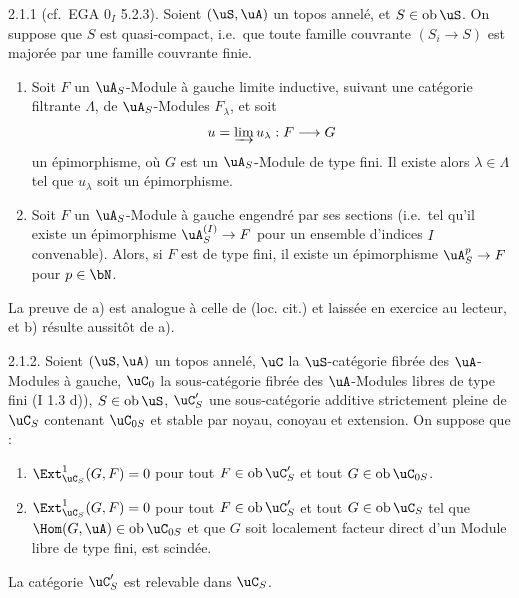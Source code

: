 \begin{lemme} 2.1.1 (cf.~EGA $0_I$ 5.2.3).
Soient $(\uS,\uA)$ un topos annel\'{e}, et $S \in \operatorname{ob} \uS$. On suppose que $S$ est quasi-compact, i.e.~que toute famille couvrante $(S_i \rightarrow S)$ est major\'{e}e par une famille couvrante finie.
\begin{enumerate}
\item[a)] Soit $F$ un $\uA_S$-Module \`{a} gauche limite inductive, suivant une cat\'{e}gorie filtrante $\Lambda$, de $\uA_S$-Modules $F_\lambda$, et soit
\[
u = \varinjlim u_\lambda : F \longrightarrow G
\]
un \'{e}pimorphisme, o\`{u} $G$ est un $\uA_S$-Module de type fini. Il existe alors $\lambda \in \Lambda$ tel que $u_\lambda$ soit un \'{e}pimorphisme.
\item[b)] Soit $F$ un $\uA_S$-Module \`{a} gauche engendr\'{e} par ses sections (i.e.~tel qu'il existe un \'{e}pimorphisme $\uA_S^{(I)} \rightarrow F$ pour un ensemble d'indices $I$ convenable). Alors, si $F$ est de type fini, il existe un \'{e}pimorphisme $\uA_S^p \rightarrow F$ pour $p \in \bN$.
\end{enumerate}
\end{lemme}

La preuve de a) est analogue \`{a} celle de (loc. cit.) et laiss\'{e}e en exercice au lecteur, et b) r\'{e}sulte aussit\^{o}t de a).

\begin{lemme} 2.1.2.
Soient $(\uS,\uA)$ un topos annel\'{e}, $\uC$ la $\uS$-cat\'{e}gorie fibr\'{e}e des $\uA$-Modules \`{a} gauche, $\uC_0$ la sous-cat\'{e}gorie fibr\'{e}e des $\uA$-Modules libres de type fini (I 1.3 d)), $S \in \operatorname{ob} \uS$, $\uC'_S$ une sous-cat\'{e}gorie additive strictement pleine de $\uC_S$ contenant $\uC_{0S}$ et stable par noyau, conoyau et extension. On suppose que :
\begin{enumerate}
\item[(i)] $\Ext_{\uC_S}^1(G,F) = 0$ pour tout $F \in \operatorname{ob} \uC'_S$ et tout $G \in \operatorname{ob} \uC_{0S}$.
\item[(ii)] $\Ext_{\uC_S}^1(G,F) = 0$ pour tout $F \in \operatorname{ob} \uC'_S$ et tout $G \in \operatorname{ob} \uC_S$ tel que $\Hom(G,\uA) \in \operatorname{ob} \uC_{0S}$ et que $G$ soit localement facteur direct d'un Module libre de type fini, est scind\'{e}e.
\end{enumerate}
La cat\'{e}gorie $\uC'_S$ est relevable dans $\uC_S$.
\end{lemme}

